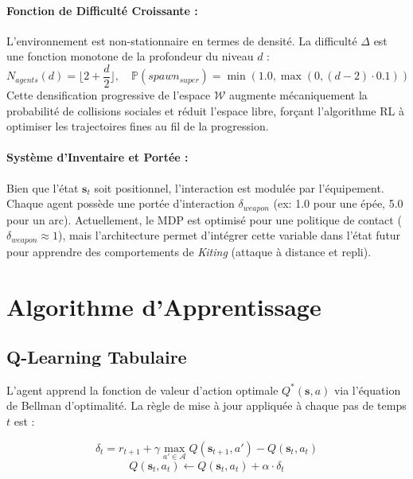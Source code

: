\documentclass[12pt,a4paper]{article}
\newcommand{\state}{\mathbf{s}}
\newcommand{\action}{a}
\newcommand{\Qval}{Q}
\begin{document}
\paragraph{Fonction de Difficulté Croissante :}
L'environnement est non-stationnaire en termes de densité. La difficulté $\Delta$ est une fonction monotone de la profondeur du niveau $d$ :
\begin{equation}
    N_{agents}(d) = \lfloor 2 + \frac{d}{2} \rfloor, \quad \mathbb{P}(spawn_{super}) = \min(1.0, \max(0, (d-2) \cdot 0.1))
\end{equation}
Cette densification progressive de l'espace $\mathcal{W}$ augmente mécaniquement la probabilité de collisions sociales et réduit l'espace libre, forçant l'algorithme RL à optimiser les trajectoires fines au fil de la progression.

\paragraph{Système d'Inventaire et Portée :}
Bien que l'état $\state_t$ soit positionnel, l'interaction est modulée par l'équipement. Chaque agent possède une portée d'interaction $\delta_{weapon}$ (ex: 1.0 pour une épée, 5.0 pour un arc). 
Actuellement, le MDP est optimisé pour une politique de contact ($\delta_{weapon} \approx 1$), mais l'architecture permet d'intégrer cette variable dans l'état futur pour apprendre des comportements de \textit{Kiting} (attaque à distance et repli).

\section{Algorithme d'Apprentissage}

\subsection{Q-Learning Tabulaire}
L'agent apprend la fonction de valeur d'action optimale $\Qval^*(\state, \action)$ via l'équation de Bellman d'optimalité. La règle de mise à jour appliquée à chaque pas de temps $t$ est :

\begin{equation}
    \delta_t = r_{t+1} + \gamma \max_{\action' \in \mathcal{A}} \Qval(\state_{t+1}, \action') - \Qval(\state_t, \action_t)
\end{equation}
\begin{equation}
    \Qval(\state_t, \action_t) \leftarrow \Qval(\state_t, \action_t) + \alpha \cdot \delta_t
\end{equation}
\end{document}
